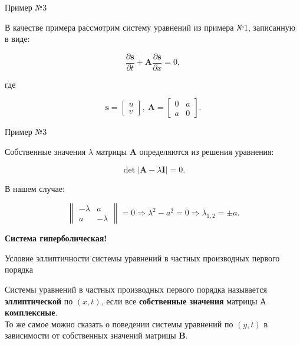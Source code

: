\documentclass[10pt,xcolor=pst,aspectratio=169]{beamer}
\begin{document}
\begin{frame}{Пример №3}

    \transdissolve[duration=0.1]
    \justifying
    \large

    В качестве примера рассмотрим систему уравнений из примера №1, записанную в виде:

    \[
        \frac{\partial \mathbf{s}}{\partial t} + \mathbf{A} \frac{\partial \mathbf{s}}{\partial x} = 0,
    \]

    где

    \[
        \mathbf{s}
        =
        \begin{bmatrix}
            u \\
            v
        \end{bmatrix}, \:
        \mathbf{A}
        =
        \begin{bmatrix}
            0 & a \\
            a & 0
        \end{bmatrix}.
    \]

\end{frame}

\begin{frame}{Пример №3}

    \transdissolve[duration=0.1]
    \justifying
    \large

    Собственные значения $\lambda$ матрицы $\mathbf{A}$ определяются из решения уравнения:

    \[
        \det \left| \mathbf{A} - \lambda \mathbf{I} \right| = 0.
    \]

    В нашем случае:

    \[
        \begin{Vmatrix}
            - \lambda & a \\
            a & - \lambda
        \end{Vmatrix}
        = 0
        \Rightarrow \lambda^{2} - a^{2} = 0
        \Rightarrow \lambda_{1,2} = \pm a.
    \]

    \begin{center}
        \textbf{Система гиперболическая!}
    \end{center}

\end{frame}

\begin{frame}{Условие эллиптичности системы уравнений в частных производных первого порядка}

    \transdissolve[duration=0.1]
    \justifying
    \large

    Системы уравнений в частных производных первого порядка называется \textbf{эллиптической} по $(x,t)$, если все \textbf{собственные значения} матрицы $\mathbf{А}$ \textbf{комплексные}.\\

    То же самое можно сказать о поведении системы уравнений по $(y,t)$ в зависимости от собственных значений матрицы $\mathbf{B}$.

\end{frame}
\end{document}
